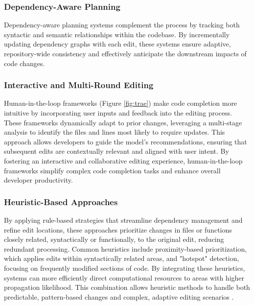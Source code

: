 \subsubsection{Dependency-Aware Planning}

Dependency-aware planning systems complement the process by tracking both syntactic and semantic relationships within the codebase. By incrementally updating dependency graphs with each edit, these systems ensure adaptive, repository-wide consistency and effectively anticipate the downstream impacts of code changes. 

\subsubsection{Interactive and Multi-Round Editing}

Human-in-the-loop frameworks (Figure \ref{fig:trae}) make code completion more intuitive by incorporating user inputs and feedback into the editing process. These frameworks dynamically adapt to prior changes, leveraging a multi-stage analysis to identify the files and lines most likely to require updates. This approach allows developers to guide the model's recommendations, ensuring that subsequent edits are contextually relevant and aligned with user intent. By fostering an interactive and collaborative editing experience, human-in-the-loop frameworks simplify complex code completion tasks and enhance overall developer productivity.

\subsubsection{Heuristic-Based Approaches}

By applying rule-based strategies that streamline dependency management and refine edit locations, these approaches prioritize changes in files or functions closely related, syntactically or functionally, to the original edit, reducing redundant processing. Common heuristics include proximity-based prioritization, which applies edits within syntactically related areas, and "hotspot" detection, focusing on frequently modified sections of code. By integrating these heuristics, systems can more efficiently direct computational resources to areas with higher propagation likelihood. This combination allows heuristic methods to handle both predictable, pattern-based changes and complex, adaptive editing scenarios \cite{coeditor, coedpilot}.

\vspace{1cm}

